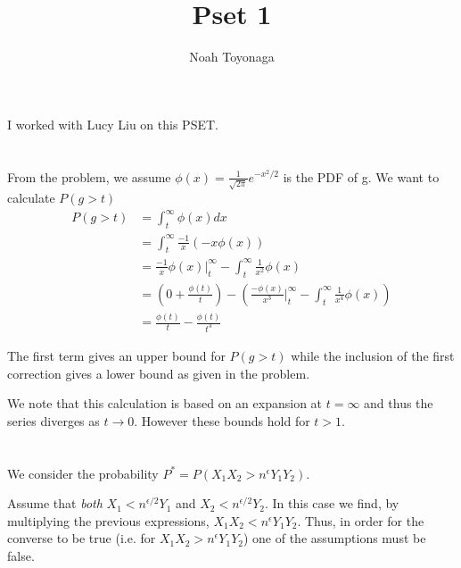 \documentclass{article}
\title{Pset 1}
\author{Noah Toyonaga}
\begin{document}
\maketitle

I worked with Lucy Liu on this PSET. 


\section{}


From the problem, we assume $\phi(x) = \frac{1}{\sqrt{2\pi}} e^{-x^2/2}$ is the PDF of g. 
We want to calculate $P\left(g>t\right)$
\begin{equation}
	\begin{split}
		P\left(g>t\right) &= \int_t^\infty \phi\left(x\right)dx \\
				  &=  \int_t^\infty \frac{-1}{x} \left(-x\phi\left(x\right)\right) \\
				  &=  \frac{-1}{x}\phi\left(x\right) |_t^\infty - \int_t^\infty \frac{1}{x^2} \phi\left(x\right) \\
				  &= \left( 0 + \frac{\phi\left(t\right)}{t}\right) - \left(\frac{-\phi\left(x\right)}{x^3}|_t^\infty - \int_t^\infty \frac{1}{x^4} \phi\left(x\right)\right) \\
				  &= \frac{\phi\left(t\right)}{t} - \frac{\phi\left(t\right)}{t^3}
	\end{split}
\end{equation}

The first term gives an upper bound for $P(g>t)$ while the inclusion of the first correction gives a lower bound as given in the problem.

We note that this calculation is based on an expansion at $t=\infty$ and thus the series diverges as $t\rightarrow 0 $.  However these bounds hold for $t>1$.


\section{}

\subsection{}

We consider the probability $P^* = P\left(X_1X_2>n^\epsilon Y_1Y_2\right)$. 

Assume that \textit{both} $X_1<n^{\epsilon/2}Y_1$ and $X_2<n^{\epsilon/2}Y_2$.
In this case we find, by multiplying the previous expressions, $X_1X_2<n^\epsilon Y_1Y_2$. 
Thus, in order for the converse to be true (i.e. for $X_1X_2>n^\epsilon Y_1Y_2$) one of the assumptions must be false. 
\end{document}
